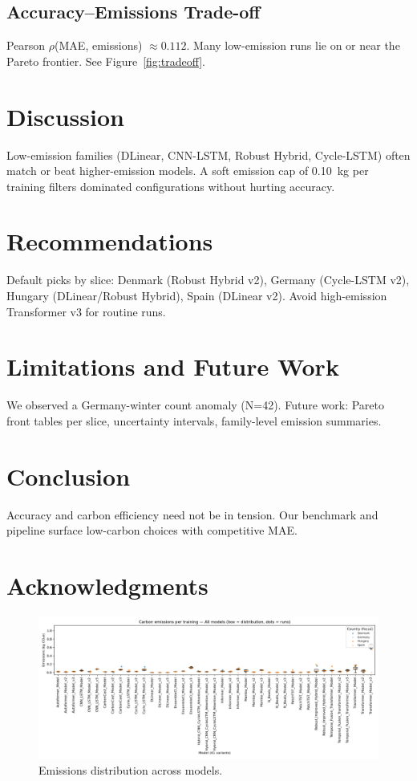 \documentclass[10pt,conference]{IEEEtran}
\begin{document}
\subsection{Accuracy--Emissions Trade-off}
Pearson $\rho$(MAE, emissions) $\approx 0.112$. Many low-emission runs lie on or near the Pareto frontier. See Figure~\ref{fig:tradeoff}.

\section{Discussion}
Low-emission families (DLinear, CNN-LSTM, Robust Hybrid, Cycle-LSTM) often match or beat higher-emission models. A soft emission cap of \SI{0.10}{kg} per training filters dominated configurations without hurting accuracy.

\section{Recommendations}
Default picks by slice: Denmark (Robust Hybrid v2), Germany (Cycle-LSTM v2), Hungary (DLinear/Robust Hybrid), Spain (DLinear v2). Avoid high-emission Transformer v3 for routine runs.

\section{Limitations and Future Work}
We observed a Germany-winter count anomaly (N=42). Future work: Pareto front tables per slice, uncertainty intervals, family-level emission summaries.

\section{Conclusion}
Accuracy and carbon efficiency need not be in tension. Our benchmark and pipeline surface low-carbon choices with competitive MAE.

\section*{Acknowledgments}

\begin{figure}[t]
  \centering
  \includegraphics[width=0.95\linewidth]{../Results/Benchmark/boxplot_emissions_all_models.png}
  \caption{Emissions distribution across models.}
  \label{fig:emissions_boxplots}
\end{figure}
\end{document}
